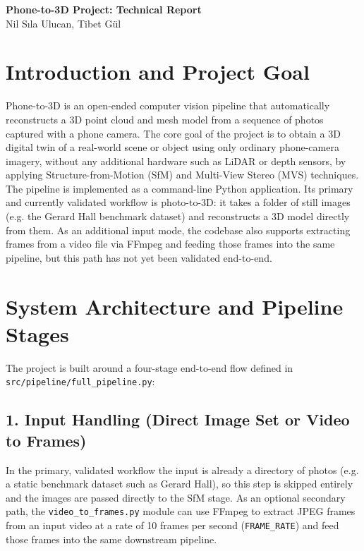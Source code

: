 \documentclass[11pt]{article}
\begin{document}
\vspace{-1.8cm}
\begin{center}
{\LARGE\textbf{Phone-to-3D Project: Technical Report}}\\[0.3cm]
Nil Sıla Ulucan, Tibet Gül
\end{center}
\vspace{-0.4cm}

\section{Introduction and Project Goal}
Phone-to-3D is an open-ended computer vision pipeline that automatically
reconstructs a 3D point cloud and mesh model from a sequence of photos
captured with a phone camera. The core goal of the project is to obtain a 3D
digital twin of a real-world scene or object using only ordinary
phone-camera imagery, without any additional hardware such as LiDAR or
depth sensors, by applying Structure-from-Motion (SfM) and Multi-View
Stereo (MVS) techniques. The pipeline is implemented as a command-line
Python application. Its primary and currently validated workflow is
photo-to-3D: it takes a folder of still images (e.g. the Gerard Hall
benchmark dataset) and reconstructs a 3D model directly from them. As an
additional input mode, the codebase also supports extracting frames from a
video file via FFmpeg and feeding those frames into the same pipeline, but
this path has not yet been validated end-to-end.

\section{System Architecture and Pipeline Stages}
The project is built around a four-stage end-to-end flow defined in
\texttt{src/pipeline/full\_pipeline.py}:

\subsection{1. Input Handling (Direct Image Set or Video to Frames)}
In the primary, validated workflow the input is already a directory of
photos (e.g. a static benchmark dataset such as Gerard Hall), so this step is
skipped entirely and the images are passed directly to the SfM stage. As an
optional secondary path, the \texttt{video\_to\_frames.py} module can use
FFmpeg to extract JPEG frames from an input video at a rate of 10 frames per
second (\texttt{FRAME\_RATE}) and feed those frames into the same downstream
pipeline.
\end{document}

